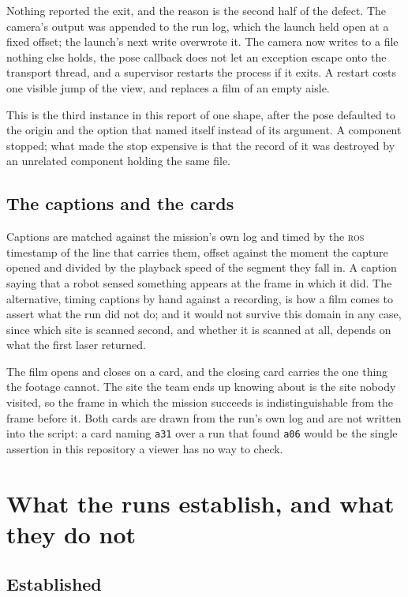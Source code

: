\documentclass[11pt,a4paper]{article}
\theoremstyle{definition}
\newcommand{\code}[1]{\texttt{\small #1}}
\newcommand{\site}[1]{\code{#1}}
\begin{document}
Nothing reported the exit, and the reason is the second half of the defect. The
camera's output was appended to the run log, which the launch held open at a
fixed offset; the launch's next write overwrote it. The camera now writes to a
file nothing else holds, the pose callback does not let an exception escape
onto the transport thread, and a supervisor restarts the process if it exits. A
restart costs one visible jump of the view, and replaces a film of an empty
aisle.

This is the third instance in this report of one shape, after the pose
defaulted to the origin and the option that named itself instead of its
argument. A component stopped; what made the stop expensive is that the record
of it was destroyed by an unrelated component holding the same file.

\subsection{The captions and the cards}

Captions are matched against the mission's own log and timed by the
\textsc{ros} timestamp of the line that carries them, offset against the moment
the capture opened and divided by the playback speed of the segment they fall
in. A caption saying that a robot sensed something appears at the frame in
which it did. The alternative, timing captions by hand against a recording, is
how a film comes to assert what the run did not do; and it would not survive
this domain in any case, since which site is scanned second, and whether it is
scanned at all, depends on what the first laser returned.

The film opens and closes on a card, and the closing card carries the one thing
the footage cannot. The site the team ends up knowing about is the site nobody
visited, so the frame in which the mission succeeds is indistinguishable from
the frame before it. Both cards are drawn from the run's own log and are not
written into the script: a card naming \site{a31} over a run that found
\site{a06} would be the single assertion in this repository a viewer has no
way to check.

\section{What the runs establish, and what they do not}
\label{sec:established}

\subsection{Established}
\end{document}
